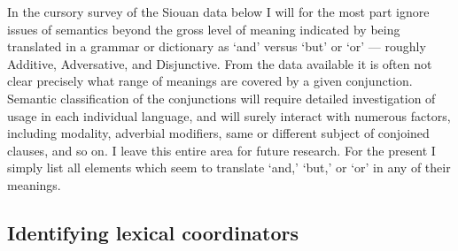 \documentclass[output=paper]{LSP/langsci}
\begin{document}
In the cursory survey of the Siouan data below I will for the most part ignore issues of semantics beyond the gross level of meaning indicated by being translated in a grammar or dictionary as `and' versus `but' or `or' --- roughly Additive, Adversative, and Disjunctive. From the data available it is often not clear precisely what range of meanings are covered by a given conjunction. Semantic classification of the conjunctions will require detailed investigation of usage in each individual language, and will surely interact with numerous factors, including modality, adverbial modifiers, same or different subject of conjoined clauses, and so on. I leave this entire area for future research. For the present I simply list all elements which seem to translate `and,' `but,' or `or' in any of their meanings.

\subsection{Identifying lexical coordinators}
\end{document}
